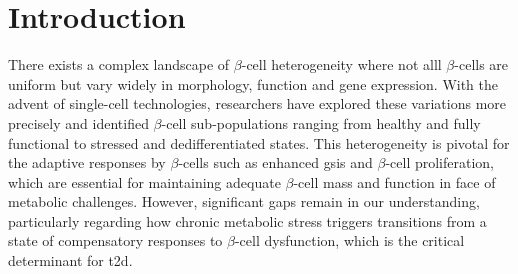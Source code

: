 \section{Introduction}
\label{sec:chp3_intro}
\par There exists a complex landscape of $\beta$-cell heterogeneity where not alll $\beta$-cells are uniform but vary widely in morphology, function and gene expression. With the advent of single-cell technologies, researchers have explored these variations more precisely and identified $\beta$-cell sub-populations ranging from healthy and fully functional to stressed and dedifferentiated states. This heterogeneity is pivotal for the adaptive responses by $\beta$-cells such as enhanced \gls{gsis} and $\beta$-cell proliferation, which are essential for maintaining adequate $\beta$-cell mass and function in face of metabolic challenges. However, significant gaps remain in our understanding, particularly regarding how chronic metabolic stress triggers transitions from a state of compensatory responses to $\beta$-cell dysfunction, which is the critical determinant for \gls{t2d}.\\ 

